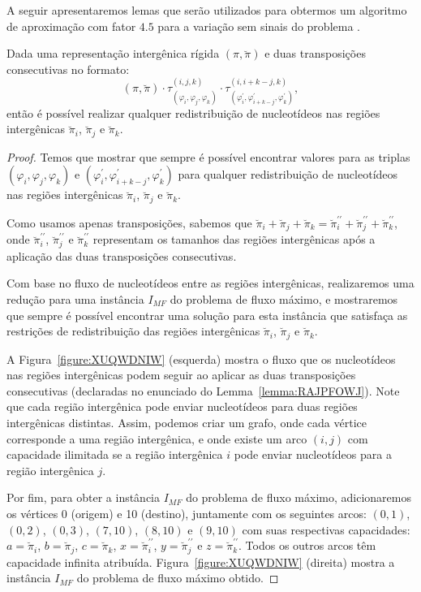 A seguir apresentaremos lemas que serão utilizados para obtermos um algoritmo de aproximação com fator $4.5$ para a variação sem sinais do problema \SbIRT{}.

\begin{lemma}\label{lemma:RAJPFOWJ}
Dada uma representação intergênica rígida $(\pi,\breve\pi)$ e duas transposições consecutivas no formato:
$$(\pi,\breve\pi)\cdot\tau^{(i,j,k)}_{(\varphi_i,\varphi_j,\varphi_k)}\cdot\tau^{(i,i+k-j,k)}_{(\varphi^\prime_i,\varphi^\prime_{i+k-j},\varphi^\prime_k)},$$
então é possível realizar qualquer redistribuição de nucleotídeos nas regiões intergênicas $\breve\pi_i$, $\breve\pi_j$ e $\breve\pi_k$.
\end{lemma} 
\begin{proof}
Temos que mostrar que sempre é possível encontrar valores para as triplas $(\varphi_i,\varphi_j,\varphi_k)$ e $(\varphi^\prime_i,\varphi^\prime_{i+k-j},\varphi^\prime_k)$ para qualquer redistribuição de nucleotídeos nas regiões intergênicas $\breve\pi_i$, $\breve\pi_j$ e $\breve\pi_k$.

Como usamos apenas transposições, sabemos que $\breve\pi_i + \breve\pi_j + \breve\pi_k = \breve\pi^{\prime\prime}_i + \breve\pi^{\prime\prime}_j + \breve\pi^{\prime\prime}_k$, onde $\breve\pi^{\prime\prime}_i$, $\breve\pi^{\prime\prime}_j$ e $\breve \pi^{\prime\prime}_k$ representam os tamanhos das regiões intergênicas após a aplicação das duas transposições consecutivas.

Com base no fluxo de nucleotídeos entre as regiões intergênicas, realizaremos uma redução para uma instância $I_{MF}$ do problema de fluxo máximo, e mostraremos que sempre é possível encontrar uma solução para esta instância que satisfaça as restrições de redistribuição das regiões intergênicas $\breve\pi_i$, $\breve\pi_j$ e $\breve\pi_k$.

A Figura~\ref{figure:XUQWDNIW} (esquerda) mostra o fluxo que os nucleotídeos nas regiões intergênicas podem seguir ao aplicar as duas transposições consecutivas (declaradas no enunciado do Lemma~\ref{lemma:RAJPFOWJ}). Note que cada região intergênica pode enviar nucleotídeos para duas regiões intergênicas distintas. Assim, podemos criar um grafo, onde cada vértice corresponde a uma região intergênica, e onde existe um arco $(i,j)$ com capacidade ilimitada se a região intergênica $i$ pode enviar nucleotídeos para a região intergênica $j$.

Por fim, para obter a instância $I_{MF}$ do problema de fluxo máximo, adicionaremos os vértices 0 (origem) e 10 (destino), juntamente com os seguintes arcos: $(0,1)$, $(0, 2)$, $(0,3)$, $(7,10)$, $(8,10)$ e $(9,10)$ com suas respectivas capacidades: $a=\breve\pi_i$, $b=\breve\pi_j$, $c=\breve\pi_k$, $x=\breve\pi^{\prime\prime}_i$, $y=\breve\pi^{\prime\prime}_j $ e $z=\breve\pi^{\prime\prime}_k$. Todos os outros arcos têm capacidade infinita atribuída. Figura~\ref{figure:XUQWDNIW} (direita) mostra a instância $I_{MF}$ do problema de fluxo máximo obtido.


\end{proof}
